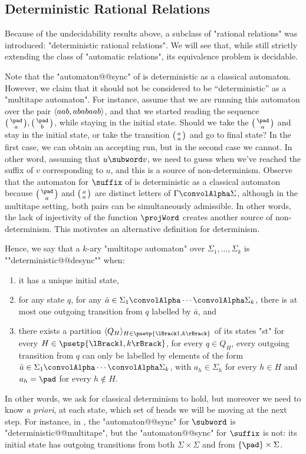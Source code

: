 \subsection{Deterministic Rational Relations}
\label{sec:prelim-automatic-drat}

Because of the undecidability results above, a subclass of "rational relations" was introduced:
"deterministic rational relations". We will see that, while still strictly extending the class of
"automatic relations", its equivalence problem is decidable.

Note that the "automaton@@sync" of  is deterministic
as a classical automaton. However, we claim that it should not be considered to be ``deterministic''
as a "multitape automaton".
For instance, assume that we are running this automaton over the pair
$\langle aab, ababaab\rangle$, and that we started reading the sequence $\pair{\pad}{a}, \pair{\pad}{b}$,
while staying in the initial state. Should we take the
$\pair{\pad}{a}$ and stay in the initial state, or take the transition $\pair{a}{a}$ and go to 
final state? In the first case, we can obtain an accepting run, but in the second case we cannot.
In other word, assuming that $u \subword v$, we need to guess when we've reached the suffix of
$v$ corresponding to $u$, and this is a source of non-determinism. Observe that
the automaton for $\suffix$ of  is deterministic as a classical automaton
because $\pair{\pad}{a}$ and $\pair{a}{a}$ are distinct letters of $\Gamma\convolAlpha\Sigma$, 
although in the multitape setting, both pairs can be simultaneously admissible.
In other words, the lack of injectivity of the function $\projWord$ creates another
source of non-determinism. This motivates an alternative definition for determinism.

Hence, we say that a $k$-ary "multitape automaton" over $\Sigma_1,\dotsc,\Sigma_k$
is ""deterministic@@desync"" when:
\begin{enumerate}
	\item it has a unique initial state,
	\item for any state $q$, for any $\bar a \in \Sigma_1\convolAlpha\cdots\convolAlpha\Sigma_k$,
		there is at most one outgoing transition from $q$ labelled by $\bar a$, and
	\item there exists a partition $\tup{Q_H}_{H \in \psetp{\lBrack 1,k\rBrack}}$ of its states 	
		"st" for every $H\in\psetp{\lBrack 1,k\rBrack}$, for every $q \in Q_H$,
		every outgoing transition from $q$ can only be labelled by elements of
		the form $\bar a \in \Sigma_1\convolAlpha\cdots\convolAlpha\Sigma_k$, with
		$a_h \in \Sigma_h$ for every $h\in H$ and $a_h = \pad$ for every $h\not\in H$.
\end{enumerate}
In other words, we ask for classical determinism to hold, but moreover we need to know \emph{a priori}, at each state, which set of heads we will be moving at the next step.
For instance, in ,
the "automaton@@sync" for $\subword$ is "deterministic@@multitape",
but the "automaton@@sync" for $\suffix$ is not: its
initial state has outgoing transitions from both $\Sigma \times \Sigma$ and
from $\{\pad\}\times\Sigma$.


